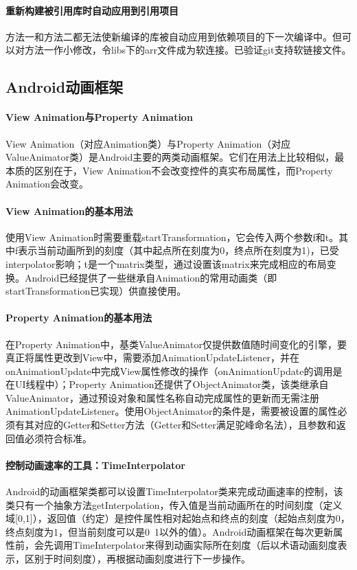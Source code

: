 \documentclass[UTF8]{ctexart}
\begin{document}
    \paragraph{重新构建被引用库时自动应用到引用项目}
    方法一和方法二都无法使新编译的库被自动应用到依赖项目的下一次编译中。但可以对方法一作小修改，令libs下的arr文件成为软连接。已验证git支持软链接文件。
    \subsection{Android动画框架}
    \paragraph{View Animation与Property Animation}
    View Animation（对应Animation类）与Property Animation（对应ValueAnimator类）是Android主要的两类动画框架。它们在用法上比较相似，最本质的区别在于，View Animation不会改变控件的真实布局属性，而Property Animation会改变。
    \paragraph{View Animation的基本用法}
    使用View Animation时需要重载startTransformation，它会传入两个参数f和t。其中f表示当前动画所到的刻度（其中起点所在刻度为0，终点所在刻度为1)，已受interpolator影响；t是一个matrix类型，通过设置该matrix来完成相应的布局变换。Android已经提供了一些继承自Animation的常用动画类（即startTransformation已实现）供直接使用。
    \paragraph{Property Animation的基本用法}
    在Property Animation中，基类ValueAnimator仅提供数值随时间变化的引擎，要真正将属性更改到View中，需要添加AnimationUpdateListener，并在onAnimationUpdate中完成View属性修改的操作（onAnimationUpdate的调用是在UI线程中）；Property Animation还提供了ObjectAnimator类，该类继承自ValueAnimator，通过预设对象和属性名称自动完成属性的更新而无需注册AnimationUpdateListener。使用ObjectAnimator的条件是，需要被设置的属性必须有其对应的Getter和Setter方法（Getter和Setter满足驼峰命名法），且参数和返回值必须符合标准。
    \paragraph{控制动画速率的工具：TimeInterpolator}
    Android的动画框架类都可以设置TimeInterpolator类来完成动画速率的控制，该类只有一个抽象方法getInterpolation，传入值是当前动画所在的时间刻度（定义域[0,1]），返回值（约定）是控件属性相对起始点和终点的刻度（起始点刻度为0，终点刻度为1，但当前刻度可以是0~1以外的值）。Android动画框架在每次更新属性前，会先调用TimeInterpolator来得到动画实际所在刻度（后以术语动画刻度表示，区别于时间刻度），再根据动画刻度进行下一步操作。
\end{document}
